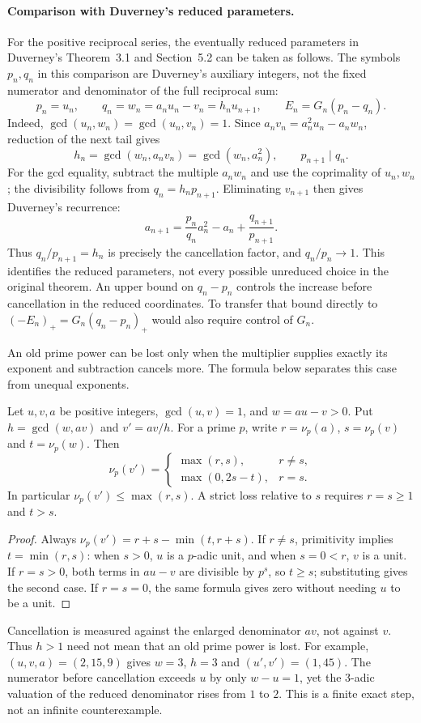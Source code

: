\documentclass[11pt]{article}
\begin{document}
\paragraph{Comparison with Duverney's reduced parameters.}
For the positive reciprocal series, the eventually reduced parameters in Duverney's
Theorem~3.1 and Section~5.2 \cite[pp.~285--286, 299--300]{duverney2001}
can be taken as follows. The symbols $p_n,q_n$ in this comparison are
Duverney's auxiliary integers, not the fixed numerator and denominator
of the full reciprocal sum:
\[
 p_n=u_n,\qquad q_n=w_n=a_nu_n-v_n=h_nu_{n+1},\qquad
 E_n=G_n(p_n-q_n).
\]
Indeed, $\gcd(u_n,w_n)=\gcd(u_n,v_n)=1$. Since
$a_nv_n=a_n^2u_n-a_nw_n$, reduction of the next tail gives
\[
 h_n=\gcd(w_n,a_nv_n)=\gcd(w_n,a_n^2),\qquad
 p_{n+1}\mid q_n.
\]
For the gcd equality, subtract the multiple $a_nw_n$ and use the
coprimality of $u_n,w_n$; the divisibility follows from
$q_n=h_np_{n+1}$. Eliminating $v_{n+1}$ then gives Duverney's recurrence:
\[
 a_{n+1}=\frac{p_n}{q_n}a_n^2-a_n+\frac{q_{n+1}}{p_{n+1}}.
\]
Thus $q_n/p_{n+1}=h_n$ is precisely the cancellation factor, and
$q_n/p_n\to1$. This identifies the reduced parameters, not every possible
unreduced choice in the original theorem. An upper bound on $q_n-p_n$ controls the increase before cancellation
in the reduced coordinates. To transfer that bound directly to
$(-E_n)_+=G_n(q_n-p_n)_+$ would also require control of $G_n$.

An old prime power can be lost only when the multiplier supplies
exactly its exponent and subtraction cancels more. The formula below
separates this case from unequal exponents.

\begin{lemma}\label{long243:res:valuationtransition}
Let $u,v,a$ be positive integers, $\gcd(u,v)=1$, and $w=au-v>0$.
Put $h=\gcd(w,av)$ and $v'=av/h$. For a prime $p$, write
$r=\nu_p(a)$, $s=\nu_p(v)$ and $t=\nu_p(w)$. Then
\[
 \nu_p(v')=
 \begin{cases}
 \max(r,s),&r\ne s,\\
 \max(0,2s-t),&r=s.
 \end{cases}
\]
In particular $\nu_p(v')\le\max(r,s)$. A strict loss relative to $s$
requires $r=s\ge1$ and $t>s$.
\end{lemma}
\begin{proof}
Always $\nu_p(v')=r+s-\min(t,r+s)$. If $r\ne s$, primitivity implies
$t=\min(r,s)$: when $s>0$, $u$ is a $p$-adic unit, and when $s=0<r$,
$v$ is a unit. If $r=s>0$, both terms in $au-v$ are divisible by $p^s$,
so $t\ge s$; substituting gives the second case. If $r=s=0$, the same
formula gives zero without needing $u$ to be a unit.
\end{proof}
Cancellation is measured against the enlarged denominator $av$, not
against $v$. Thus $h>1$ need not mean that an old prime power is lost.
For example, $(u,v,a)=(2,15,9)$ gives $w=3$, $h=3$ and
$(u',v')=(1,45)$. The numerator before cancellation exceeds $u$ by only
$w-u=1$, yet the $3$-adic valuation of the reduced denominator rises
from $1$ to $2$.
This is a finite exact step, not an infinite counterexample.
\end{document}
